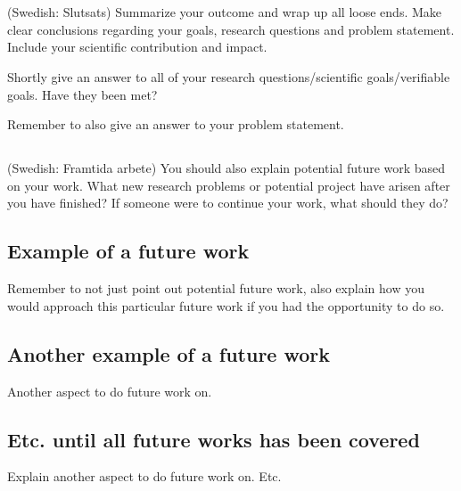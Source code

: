 \section{}\label{sec:conclusions}
(Swedish: Slutsats) Summarize your outcome and wrap up all loose ends. Make clear conclusions regarding your goals, research questions and problem statement. Include your scientific contribution and impact.

Shortly give an answer to all of your research questions/scientific goals/verifiable goals. Have they been met?

Remember to also give an answer to your problem statement.

\subsection{}
(Swedish: Framtida arbete) You should also explain potential future work based on your work. What new research problems or potential project have arisen after you have finished? If someone were to continue your work, what should they do?

\subsection{Example of a future work}
Remember to not just point out potential future work, also explain how you would approach this particular future work if you had the opportunity to do so.

\subsection{Another example of a future work}
Another aspect to do future work on.

\subsection{Etc. until all future works has been covered}
Explain another aspect to do future work on. Etc.

